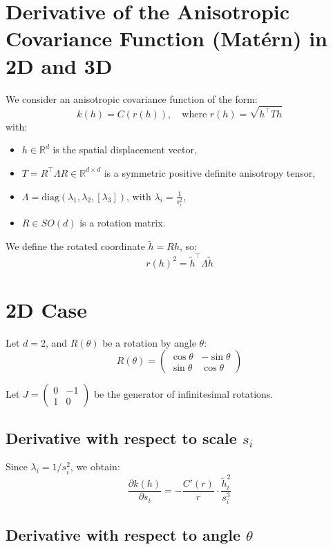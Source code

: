 \documentclass{article}
\begin{document}
\section*{Derivative of the Anisotropic Covariance Function (Matérn) in 2D and 3D}

We consider an anisotropic covariance function of the form:
\[
k(h) = C\left( r(h) \right), \quad \text{where } r(h) = \sqrt{h^\top T h}
\]
with:
\begin{itemize}
  \item \( h \in \mathbb{R}^d \) is the spatial displacement vector,
  \item \( T = R^\top \Lambda R \in \mathbb{R}^{d \times d} \) is a symmetric positive definite anisotropy tensor,
  \item \( \Lambda = \mathrm{diag}(\lambda_1, \lambda_2, [\lambda_3]) \), with \( \lambda_i = \frac{1}{s_i^2} \),
  \item \( R \in SO(d) \) is a rotation matrix.
\end{itemize}

We define the rotated coordinate \( \tilde{h} = R h \), so:
\[
{r(h)}^2 = \tilde{h}^\top \Lambda \tilde{h}
\]

\section*{2D Case}

Let \( d = 2 \), and \( R(\theta) \) be a rotation by angle \( \theta \):
\[
R(\theta) = \begin{pmatrix}
\cos\theta & -\sin\theta \\
\sin\theta & \cos\theta
\end{pmatrix}
\]

Let \( J = \begin{pmatrix} 0 & -1 \\ 1 & 0 \end{pmatrix} \) be the generator of infinitesimal rotations.

\subsection*{Derivative with respect to scale \( s_i \)}

Since \( \lambda_i = 1/s_i^2 \), we obtain:
\[
\frac{\partial k(h)}{\partial s_i} = - \frac{C'(r)}{r} \cdot \frac{\tilde{h}_i^2}{s_i^3}
\]

\subsection*{Derivative with respect to angle \( \theta \)}
\end{document}
